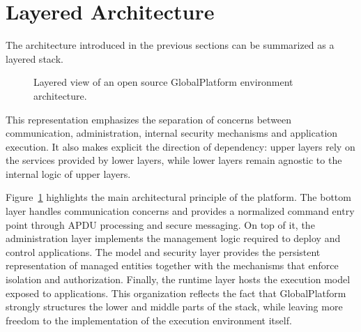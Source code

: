 
\section{Layered Architecture}

The architecture introduced in the previous sections can be summarized as a
layered stack. 

\begin{figure}[ht]
  \centering
  \caption{Layered view of an open source GlobalPlatform environment architecture.}
  \label{fig:gp-layered-architecture}
\end{figure}

This representation emphasizes the separation of concerns between
communication, administration, internal security mechanisms and application
execution. It also makes explicit the direction of dependency: upper layers
rely on the services provided by lower layers, while lower layers remain
agnostic to the internal logic of upper layers.

Figure~\ref{fig:gp-layered-architecture} highlights the main architectural
principle of the platform. The bottom layer handles communication concerns and
provides a normalized command entry point through APDU processing and secure
messaging. On top of it, the administration layer implements the management
logic required to deploy and control applications. The model and security layer
provides the persistent representation of managed entities together with the
mechanisms that enforce isolation and authorization. Finally, the runtime layer
hosts the execution model exposed to applications. This organization reflects
the fact that GlobalPlatform strongly structures the lower and middle parts of
the stack, while leaving more freedom to the implementation of the execution
environment itself.

